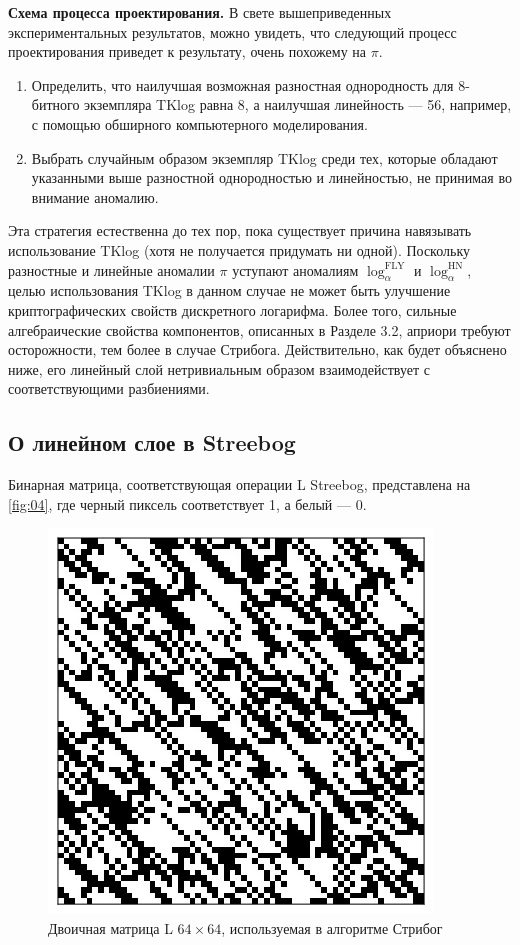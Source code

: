 \textbf{Схема процесса проектирования.} В свете вышеприведенных экспериментальных результатов, можно увидеть, что следующий процесс проектирования приведет к результату, очень похожему на \(\pi\).

\begin{enumerate}
  \item Определить, что наилучшая возможная разностная однородность для 8-битного экземпляра TKlog равна 8, а наилучшая линейность — 56, например, с помощью обширного компьютерного моделирования.
  \item Выбрать случайным образом экземпляр TKlog среди тех, которые обладают указанными выше разностной однородностью и линейностью, не принимая во внимание аномалию.
\end{enumerate}

Эта стратегия естественна до тех пор, пока существует причина навязывать использование TKlog (хотя не получается придумать ни одной). Поскольку  разностные и линейные аномалии \(\pi\) уступают аномалиям \(\log^{\text{FLY}}_\alpha\) и \(\log^{\text{HN}}_\alpha\), целью использования TKlog в данном случае не может быть улучшение криптографических свойств дискретного логарифма. Более того, сильные алгебраические свойства компонентов, описанных в Разделе 3.2, априори требуют осторожности, тем более в случае Стрибога. Действительно, как будет объяснено ниже, его линейный слой нетривиальным образом взаимодействует с соответствующими разбиениями.

\subsection{О линейном слое в Streebog}
Бинарная матрица, соответствующая операции L Streebog, представлена на \autoref{fig:04}, где черный пиксель соответствует 1, а белый — 0.

\begin{figure}
  \centering
  \includegraphics[scale=0.9]{contents/pics/Streebog_matrix.png}
  \caption{Двоичная матрица L \(64 \times 64\), используемая в алгоритме Стрибог}
  \label{fig:fig04}
\end{figure}

